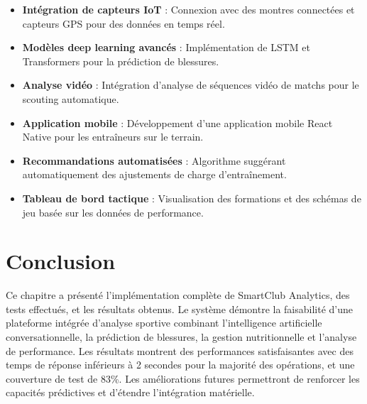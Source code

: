 \begin{itemize}
    \item \textbf{Intégration de capteurs IoT} : Connexion avec des montres connectées et capteurs GPS pour des données en temps réel.
    \item \textbf{Modèles deep learning avancés} : Implémentation de LSTM et Transformers pour la prédiction de blessures.
    \item \textbf{Analyse vidéo} : Intégration d'analyse de séquences vidéo de matchs pour le scouting automatique.
    \item \textbf{Application mobile} : Développement d'une application mobile React Native pour les entraîneurs sur le terrain.
    \item \textbf{Recommandations automatisées} : Algorithme suggérant automatiquement des ajustements de charge d'entraînement.
    \item \textbf{Tableau de bord tactique} : Visualisation des formations et des schémas de jeu basée sur les données de performance.
\end{itemize}

\section{Conclusion}

Ce chapitre a présenté l'implémentation complète de SmartClub Analytics, des tests effectués, et les résultats obtenus. Le système démontre la faisabilité d'une plateforme intégrée d'analyse sportive combinant l'intelligence artificielle conversationnelle, la prédiction de blessures, la gestion nutritionnelle et l'analyse de performance. Les résultats montrent des performances satisfaisantes avec des temps de réponse inférieurs à 2 secondes pour la majorité des opérations, et une couverture de test de 83\%. Les améliorations futures permettront de renforcer les capacités prédictives et d'étendre l'intégration matérielle.
